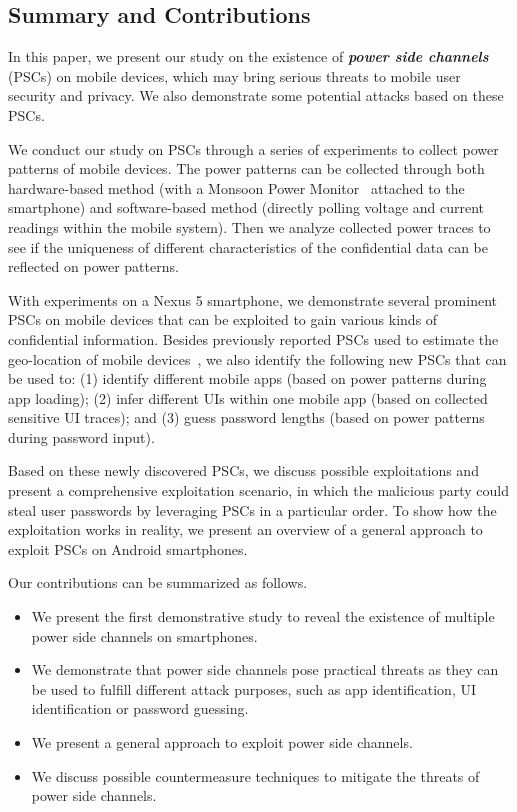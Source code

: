 \documentclass{sig-alternate}
\begin{document}
\subsection{Summary and Contributions}

In this paper, we present our study on the existence of \textbf{\emph{power side channels}} (PSCs) on mobile devices, which may bring serious threats to mobile user security and privacy. We also demonstrate some potential attacks based on these PSCs.

We conduct our study on PSCs through a series of experiments to collect power patterns of mobile devices. The power patterns can be collected through both hardware-based method (with a Monsoon Power Monitor~\cite{monsoonPM} attached to the smartphone) and software-based method (directly polling voltage and current readings within the mobile system). Then we analyze collected power traces to see if the uniqueness of different characteristics of the confidential data can be reflected on power patterns.


With experiments on a Nexus 5 smartphone, we demonstrate several prominent PSCs on mobile devices that can be exploited to gain various kinds of confidential information. Besides previously reported PSCs used to estimate the geo-location of mobile devices~\cite{MichalevskyNSB15}, we also identify the following new PSCs that can be used to: (1) identify different mobile apps (based on power patterns during app loading); (2) infer different UIs within one mobile app (based on collected sensitive UI traces); and (3) guess password lengths (based on power patterns during password input).

Based on these newly discovered PSCs, we discuss possible exploitations and present a comprehensive exploitation scenario, in which the malicious party could steal user passwords by leveraging PSCs in a particular order. To show how the exploitation works in reality, we present an overview of a general approach to exploit PSCs on Android smartphones. 


Our contributions can be summarized as follows.
\begin{itemize}
\item We present the first demonstrative study to reveal the existence of multiple power side channels on smartphones.


\item We demonstrate that power side channels pose practical threats as they can be used to fulfill different attack purposes, such as app identification, UI identification or password guessing.

\item We present a general approach to exploit power side channels.


\item We discuss possible countermeasure techniques to mitigate the threats of power side channels.


 \end{itemize}
 
\end{document}
